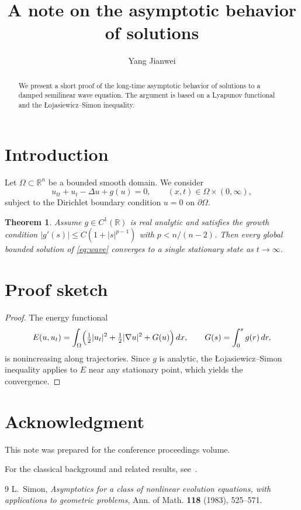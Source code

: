 \documentclass{amsproc}
\title[Short running title]{A note on the asymptotic behavior of solutions}
\author{Yang Jianwei}
\newtheorem{theorem}{Theorem}[section]
\theoremstyle{definition}
\newcommand{\R}{\mathbb{R}}
\newcommand{\Om}{\Omega}
\begin{document}
\begin{abstract}
We present a short proof of the long-time asymptotic behavior of solutions
to a damped semilinear wave equation. The argument is based on a
Lyapunov functional and the {\L}ojasiewicz--Simon inequality.
\end{abstract}

\maketitle

\section{Introduction}

Let $\Om\subset\R^n$ be a bounded smooth domain. We consider
\begin{equation}\label{eq:wave}
  u_{tt} + u_t - \Delta u + g(u) = 0 , \qquad (x,t)\in\Om\times(0,\infty),
\end{equation}
subject to the Dirichlet boundary condition $u=0$ on $\partial\Om$.

\begin{theorem}
Assume $g\in C^1(\R)$ is real analytic and satisfies the growth condition
$|g'(s)|\le C(1+|s|^{p-1})$ with $p<n/(n-2)$. Then every global bounded
solution of \eqref{eq:wave} converges to a single stationary state as
$t\to\infty$.
\end{theorem}

\section{Proof sketch}

\begin{proof}
The energy functional
\begin{equation}
  E(u,u_t)=\int_{\Om}\Bigl(\tfrac12|u_t|^2+\tfrac12|\nabla u|^2+G(u)\Bigr)\,dx,
  \qquad G(s)=\int_0^s g(r)\,dr,
\end{equation}
is nonincreasing along trajectories. Since $g$ is analytic, the
{\L}ojasiewicz--Simon inequality applies to $E$ near any stationary point,
which yields the convergence.
\end{proof}

\section*{Acknowledgment}
This note was prepared for the conference proceedings volume.

For the classical background and related results, see~\cite{Si}.

\begin{thebibliography}{9}
 L.~Simon, \emph{Asymptotics for a class of nonlinear evolution
equations, with applications to geometric problems}, Ann. of Math. \textbf{118} (1983), 525--571.
\end{thebibliography}
\end{document}
